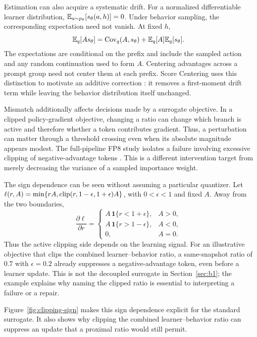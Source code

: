 Estimation can also acquire a systematic drift. For a normalized differentiable learner distribution, $\mathbb{E}_{a\sim p_\theta}[s_\theta(a,h)]=0$. Under behavior sampling, the corresponding expectation need not vanish. At fixed $h$,
\begin{equation}\label{eq:drift}
\mathbb{E}_q[A s_\theta]
=\operatorname{Cov}_q(A,s_\theta)+\mathbb{E}_q[A]\mathbb{E}_q[s_\theta].
\end{equation}
The expectations are conditional on the prefix and include the sampled action and any random continuation used to form $A$. Centering advantages across a prompt group need not center them at each prefix. Score Centering uses this distinction to motivate an additive correction \citep{score}: it removes a first-moment drift term while leaving the behavior distribution itself unchanged.

Mismatch additionally affects decisions made by a surrogate objective. In a clipped policy-gradient objective, changing a ratio can change which branch is active and therefore whether a token contributes gradient. Thus, a perturbation can matter through a threshold crossing even when its absolute magnitude appears modest. The full-pipeline FP8 study isolates a failure involving excessive clipping of negative-advantage tokens \citep{fullfp8}. This is a different intervention target from merely decreasing the variance of a sampled importance weight.

The sign dependence can be seen without assuming a particular quantizer. Let
$\ell(r,A)=\min\{rA,\operatorname{clip}(r,1-\epsilon,1+\epsilon)A\}$, with $0<\epsilon<1$ and fixed $A$. Away from the two boundaries,
\begin{equation}\label{eq:clipbranch}
\frac{\partial\ell}{\partial r}=
\begin{cases}
 A\,\mathbf{1}\{r<1+\epsilon\},& A>0,\\
 A\,\mathbf{1}\{r>1-\epsilon\},& A<0,\\
 0,&A=0.
\end{cases}
\end{equation}
Thus the active clipping side depends on the learning signal. For an illustrative objective that clips the combined learner--behavior ratio, a same-snapshot ratio of $0.7$ with $\epsilon=0.2$ already suppresses a negative-advantage token, even before a learner update. This is not the decoupled surrogate in Section~\ref{sec:b1}; the example explains why naming the clipped ratio is essential to interpreting a failure or a repair.


Figure~\ref{fig:clipping-sign} makes this sign dependence explicit for the standard surrogate. It also shows why clipping the combined learner--behavior ratio can suppress an update that a proximal ratio would still permit.

